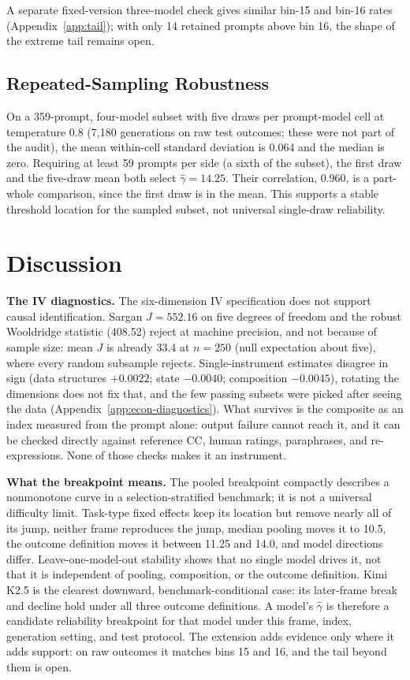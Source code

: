 \documentclass{article}
\begin{document}
A separate fixed-version three-model check gives similar bin-15 and bin-16 rates (Appendix~\ref{app:tail}); with only 14 retained prompts above bin 16, the shape of the extreme tail remains open.

\subsection{Repeated-Sampling Robustness}

On a 359-prompt, four-model subset with five draws per prompt-model cell at temperature 0.8 (7{,}180 generations on raw test outcomes; these were not part of the audit), the mean within-cell standard deviation is 0.064 and the median is zero. Requiring at least 59 prompts per side (a sixth of the subset), the first draw and the five-draw mean both select $\hat{\gamma}=14.25$. Their correlation, 0.960, is a part-whole comparison, since the first draw is in the mean. This supports a stable threshold location for the sampled subset, not universal single-draw reliability.

\section{Discussion}

\textbf{The IV diagnostics.} The six-dimension IV specification does not support causal identification. Sargan $J=552.16$ on five degrees of freedom and the robust Wooldridge statistic (408.52) reject at machine precision, and not because of sample size: mean $J$ is already 33.4 at $n=250$ (null expectation about five), where every random subsample rejects. Single-instrument estimates disagree in sign (data structures $+0.0022$; state $-0.0040$; composition $-0.0045$), rotating the dimensions does not fix that, and the few passing subsets were picked after seeing the data (Appendix~\ref{app:econ-diagnostics}). What survives is the composite as an index measured from the prompt alone: output failure cannot reach it, and it can be checked directly against reference CC, human ratings, paraphrases, and re-expressions. None of those checks makes it an instrument.

\textbf{What the breakpoint means.} The pooled breakpoint compactly describes a nonmonotone curve in a selection-stratified benchmark; it is not a universal difficulty limit. Task-type fixed effects keep its location but remove nearly all of its jump, neither frame reproduces the jump, median pooling moves it to 10.5, the outcome definition moves it between 11.25 and 14.0, and model directions differ. Leave-one-model-out stability shows that no single model drives it, not that it is independent of pooling, composition, or the outcome definition. Kimi K2.5 is the clearest downward, benchmark-conditional case: its later-frame break and decline hold under all three outcome definitions. A model's $\hat{\gamma}$ is therefore a candidate reliability breakpoint for that model under this frame, index, generation setting, and test protocol. The extension adds evidence only where it adds support: on raw outcomes it matches bins 15 and 16, and the tail beyond them is open.
\end{document}
